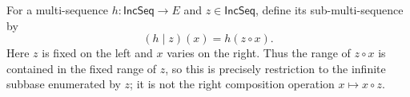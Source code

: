 \begin{definition}
For a multi-sequence $h:\mathsf{IncSeq}\to E$ and $z\in\mathsf{IncSeq}$,
define its sub-multi-sequence by
\[
(h\mathbin{|}z)(x)=h(z\circ x).
\]
Here $z$ is fixed on the left and $x$ varies on the right.  Thus the range
of $z\circ x$ is contained in the fixed range of $z$, so this is precisely
restriction to the infinite subbase enumerated by $z$; it is not the right
composition operation $x\mapsto x\circ z$.
\end{definition}
